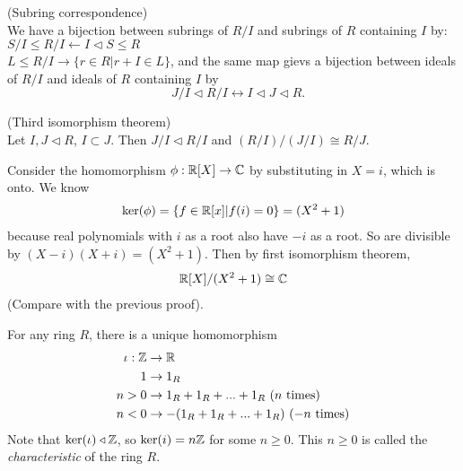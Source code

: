 \documentclass[a4paper]{article}
\begin{document}
\begin{thm} (Subring correspondence)\\
We have a bijection between subrings of $R/I$ and subrings of $R$ containing $I$ by:\\
$S/I \leq R/I \leftarrow I \triangleleft S \leq R$\\
$L \leq R/I \rightarrow \{r\in R | r+I \in L\}$, and the same map gievs a bijection between ideals of $R/I$ and ideals of $R$ containing $I$ by
\begin{equation*}
\begin{aligned}
\end{aligned}
J/I \triangleleft R/I \leftrightarrow I \triangleleft J \triangleleft R.
\end{equation*}
\end{thm}

\begin{thm} (Third isomorphism theorem)\\
Let $I,J \triangleleft R$, $I \subset J$. Then $J/I \triangleleft R/I$ and $(R/I)/(J/I) \cong R/J$.
\end{thm}

\begin{eg}
Consider the homomorphism $\phi: \mathbb{R}[X] \to \mathbb{C}$ by substituting in $X=i$, which is onto. We know
\begin{equation*}
\begin{aligned}
\ker(\phi) = \{f \in \mathbb{R}[x] | f(i) = 0\} = (X^2+1)
\end{aligned}
\end{equation*}
because real polynomials with $i$ as a root also have $-i$ as a root. So are divisible by $(X-i)(X+i) = (X^2+1)$. Then by first isomorphism theorem,
\begin{equation*}
\begin{aligned}
\mathbb{R}[X] / (X^2+1) \cong \mathbb{C}
\end{aligned}
\end{equation*}
(Compare with the previous proof).
\end{eg}

\begin{defi}
For any ring $R$, there is a unique homomorphism
\begin{equation*}
\begin{aligned}
\iota:\mathbb{Z} &\to \mathbb{R}\\
1 &\to 1_R\\
n>0 &\to 1_R+1_R+...+1_R \ (n \text{ times})\\
n<0 &\to -(1_R+1_R+...+1_R)\ (-n \text{ times})\\
\end{aligned}
\end{equation*}
Note that $\ker(\iota) \triangleleft \mathbb{Z}$, so $\ker(i) = n\mathbb{Z}$ for some $n \geq 0$. This $n \geq 0$ is called the \emph{characteristic} of the ring $R$.
\end{defi}
\end{document}
